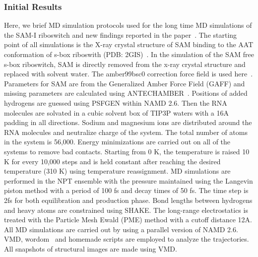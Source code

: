 \documentclass[a4paper,10pt]{article}
\begin{document}
\subsubsection*{Initial Results}

Here, we brief MD simulation protocols used for the long time MD simulations of the SAM-I riboswitch and new findings reported in the paper~\cite{SAM-I-NAR2009}.  The starting point of all simulations is the X-ray crystal structure of SAM binding to the AAT conformation of s-box riboswith (PDB: 2GIS)~\cite{montange}. In the simulation of the SAM free s-box riboswitch, SAM is directly removed from the x-ray crystal structure and replaced with solvent water. The amber99bsc0 correction force field is used here~\cite{alberto}. Parameters for SAM are from the Generalized Amber Force Field (GAFF) and missing parameters are calculated using ANTECHAMBER~\cite{wang}. Positions of added hydrogens are guessed using PSFGEN within NAMD 2.6. Then the RNA molecules are solvated in a cubic solvent box of TIP3P waters with a 16A padding in all directions. Sodium and magnesium ions are distributed around the RNA molecules and neutralize charge of the system. The total number of atoms in the system is 56,000. Energy minimizations are carried out on all of the systems to remove bad contacts. Starting from 0 K, the temperature is raised 10 K for every 10,000 steps and is held constant after reaching the desired temperature (310 K) using temperature reassignment. MD simulations are performed in the NPT ensemble with the pressure maintained using the Langevin piston method with a period of 100 fs and decay times of 50 fs. The time step is 2fs for both equilibration and production phase. Bond lengths between hydrogens and heavy atoms are constrained using SHAKE. The long-range electrostatics is treated with the Particle Mesh Ewald (PME) method with a cutoff distance 12A.  All MD simulations are carried out by using a parallel version of NAMD 2.6.  VMD, wordom~\cite{moe} and homemade scripts are employed to analyze the trajectories. All snapshots of structural images are made using VMD.

\end{document}
